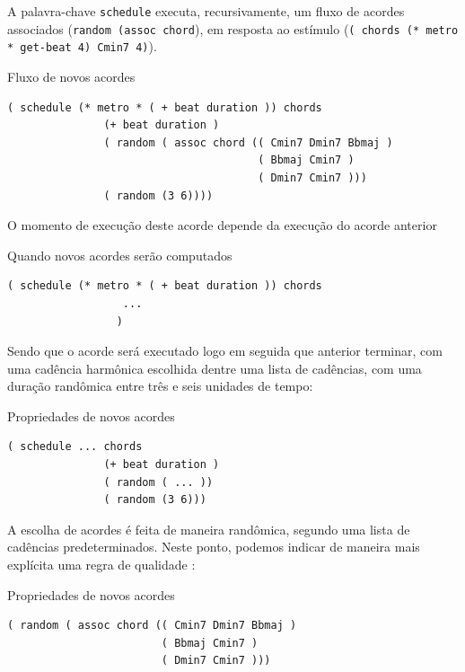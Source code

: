 A palavra-chave \verb|schedule| executa, recursivamente, um fluxo de acordes associados (\verb|random (assoc chord|), em resposta ao estímulo (\verb|( chords (* metro * get-beat 4) Cmin7 4)|). 

\begin{example}{Fluxo de novos acordes}
\begin{verbatim}
( schedule (* metro * ( + beat duration )) chords
               (+ beat duration )
               ( random ( assoc chord (( Cmin7 Dmin7 Bbmaj )
                                       ( Bbmaj Cmin7 )
                                       ( Dmin7 Cmin7 )))
               ( random (3 6))))
\end{verbatim}
\end{example}

O momento de execução deste acorde depende da execução do acorde anterior

\begin{example}{Quando novos acordes serão computados}
\begin{verbatim}
( schedule (* metro * ( + beat duration )) chords
                  ...
                 )
\end{verbatim}
\end{example}

Sendo que o acorde será executado logo em seguida que anterior terminar, com uma cadência harmônica escolhida dentre uma lista de cadências, com uma duração randômica entre três e seis unidades de tempo:

\begin{example}{Propriedades de novos acordes}
\begin{verbatim}
( schedule ... chords
               (+ beat duration )
               ( random ( ... ))
               ( random (3 6)))
\end{verbatim}
\end{example}

A escolha de acordes é feita de maneira randômica, segundo uma lista de cadências predeterminados. Neste ponto, podemos indicar de maneira mais explícita uma regra de qualidade :

\begin{example}{Propriedades de novos acordes}
\begin{verbatim}
( random ( assoc chord (( Cmin7 Dmin7 Bbmaj )
                        ( Bbmaj Cmin7 )
                        ( Dmin7 Cmin7 )))
\end{verbatim}
\end{example}

